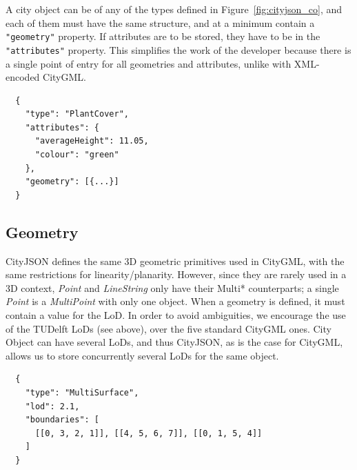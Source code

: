 %

A city object can be of any of the types defined in Figure~\ref{fig:cityjson_co}, and each of them must have the same structure, and at a minimum contain a \texttt{"geometry"} property. 
If attributes are to be stored, they have to be in the \texttt{"attributes"} property.
This simplifies the work of the developer because there is a single point of entry for all geometries and attributes, unlike with XML-encoded CityGML\@.
\begin{lstlisting}
  {
    "type": "PlantCover",
    "attributes": {
      "averageHeight": 11.05,
      "colour": "green"
    },
    "geometry": [{...}]
  }
\end{lstlisting}


\subsection{Geometry}

CityJSON defines the same 3D geometric primitives used in CityGML, with the same restrictions for linearity/planarity.
However, since they are rarely used in a 3D context, \emph{Point} and \emph{LineString} only have their Multi* counterparts; a single \emph{Point} is a \emph{MultiPoint} with only one object.
When a geometry is defined, it must contain a value for the LoD. 
In order to avoid ambiguities, we encourage the use of the TUDelft LoDs (see above), over the five standard CityGML ones.
City Object can have several LoDs, and thus CityJSON, as is the case for CityGML, allows us to store concurrently several LoDs for the same object.
\begin{lstlisting}
  {
    "type": "MultiSurface",
    "lod": 2.1,
    "boundaries": [
      [[0, 3, 2, 1]], [[4, 5, 6, 7]], [[0, 1, 5, 4]]
    ]
  }
\end{lstlisting}

